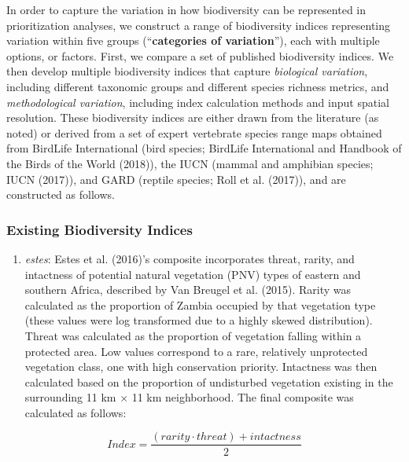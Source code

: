 \documentclass[
]{article}
\providecommand{\tightlist}{%
  \setlength{\itemsep}{0pt}\setlength{\parskip}{0pt}}
\begin{document}
In order to capture the variation in how biodiversity can be represented in prioritization analyses, we construct a range of biodiversity indices representing variation within five groups (``\textbf{categories of variation}''), each with multiple options, or factors. First, we compare a set of published biodiversity indices. We then develop multiple biodiversity indices that capture \emph{biological variation}, including different taxonomic groups and different species richness metrics, and \emph{methodological variation}, including index calculation methods and input spatial resolution. These biodiversity indices are either drawn from the literature (as noted) or derived from a set of expert vertebrate species range maps obtained from BirdLife International (bird species; BirdLife International and Handbook of the Birds of the World (2018)), the IUCN (mammal and amphibian species; IUCN (2017)), and GARD (reptile species; Roll et al. (2017)), and are constructed as follows.

\hypertarget{existing-biodiversity-indices}{%
\subsubsection{Existing Biodiversity Indices}\label{existing-biodiversity-indices}}

\begin{enumerate}
\def\labelenumi{(\arabic{enumi})}
\tightlist
\item
  \emph{estes}: Estes et al. (2016)'s composite incorporates threat, rarity, and intactness of potential natural vegetation (PNV) types of eastern and southern Africa, described by Van Breugel et al. (2015). Rarity was calculated as the proportion of Zambia occupied by that vegetation type (these values were log transformed due to a highly skewed distribution). Threat was calculated as the proportion of vegetation falling within a protected area. Low values correspond to a rare, relatively unprotected vegetation class, one with high conservation priority. Intactness was then calculated based on the proportion of undisturbed vegetation existing in the surrounding 11 km \(\times\) 11 km neighborhood. The final composite was calculated as follows:
\end{enumerate}

\[ Index = \frac{(rarity \cdot threat) + intactness}{2} \]
\end{document}
